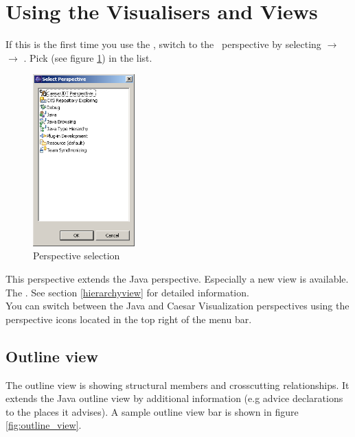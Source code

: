 \section{Using the Visualisers and Views}
If this is the first time you use the \cjdt, switch to the \caesarj ~perspective by selecting  $\rightarrow$  $\rightarrow$ . Pick  (see figure \ref{fig:select_persp}) in the list.

\begin{figure}[htbp]
	\centering
		\includegraphics[width=0.35\textwidth]{images/select_persp.png}
	\caption{Perspective selection}
	\label{fig:select_persp}
\end{figure}

This perspective extends the Java perspective. Especially a new view is available. The . See section \ref{hierarchyview} for detailed information.\\
You can switch between the Java and Caesar Visualization perspectives using the perspective icons located in the top right of the menu bar.\\
\subsection{Outline view}
The outline view is showing structural members and crosscutting relationships. It extends the Java outline view by additional information (e.g advice declarations to the places it advises). A sample outline view bar is shown in figure \ref{fig:outline_view}.

